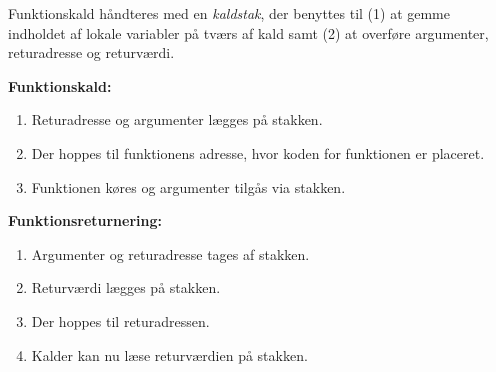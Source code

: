 \documentclass[rgb]{beamer}
\begin{document}
\begin{frame}[fragile]
\begin{footnotesize}


  Funktionskald håndteres med en \emph{kaldstak}, der benyttes til (1)
  at gemme indholdet af lokale variabler på tværs af kald samt (2) at
  overføre argumenter, returadresse og returværdi.

  \vspace{2mm}
  \begin{minipage}[t]{.64\textwidth}
  \textbf{Funktionskald:}

  \begin{enumerate}
  \item Returadresse og argumenter lægges på stakken.
  \item Der hoppes til funktionens adresse, hvor koden for funktionen er placeret.
  \item Funktionen køres og argumenter tilgås via stakken.
  \end{enumerate}

\vspace{1mm}
  \textbf{Funktionsreturnering:}

  \begin{enumerate}
  \item Argumenter og returadresse tages af stakken.
  \item Returværdi lægges på stakken.
  \item Der hoppes til returadressen.
  \item Kalder kan nu læse returværdien på stakken.
  \end{enumerate}


\end{minipage}
\end{footnotesize}
\end{frame}
\end{document}
